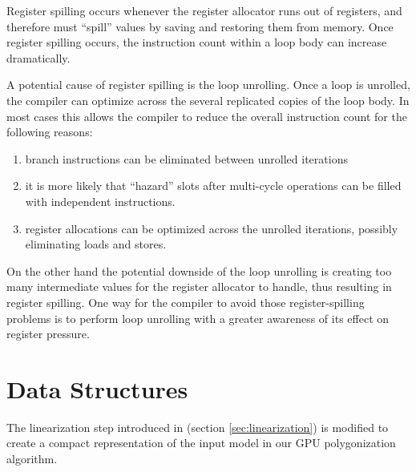 Register spilling occurs whenever the register allocator runs out of registers, and therefore must ``spill'' values by saving and restoring them from memory. Once 
register spilling occurs, the instruction count within a loop body can increase dramatically. 
 
A potential cause of register spilling is the loop unrolling. Once a loop is unrolled, the compiler can optimize across the several replicated copies of the loop 
body. In most cases this allows the compiler to reduce the overall instruction count for the following reasons:
 
 \begin{enumerate}
  \item branch instructions can be eliminated between unrolled iterations
  \item it is more likely that ``hazard'' slots after multi-cycle operations can be filled with independent instructions. 
  \item register allocations can be optimized across the unrolled iterations, possibly eliminating loads and stores.
 \end{enumerate}

On the other hand the potential downside of the loop unrolling is creating too many intermediate values for the register allocator to handle, thus resulting in 
register spilling. One way for the compiler to avoid those register-spilling problems is to perform loop unrolling with a greater awareness of its effect on register 
pressure. 

\section{Data Structures}
\label{sec:datastructure}
The \blob linearization step introduced in (section \ref{sec:linearization}) is modified to create a compact representation of the input model in our 
GPU polygonization algorithm. 

